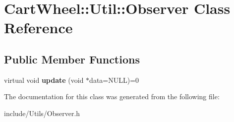 \hypertarget{classCartWheel_1_1Util_1_1Observer}{
\section{CartWheel::Util::Observer Class Reference}
\label{classCartWheel_1_1Util_1_1Observer}
}
\subsection*{Public Member Functions}
\begin{DoxyCompactItemize}
\item 
\hypertarget{classCartWheel_1_1Util_1_1Observer_a84bfc7cca2418086f770fd29265b1bf1}{
virtual void {\bfseries update} (void $\ast$data=NULL)=0}
\label{classCartWheel_1_1Util_1_1Observer_a84bfc7cca2418086f770fd29265b1bf1}

\end{DoxyCompactItemize}


The documentation for this class was generated from the following file:\begin{DoxyCompactItemize}
\item 
include/Utils/Observer.h\end{DoxyCompactItemize}
